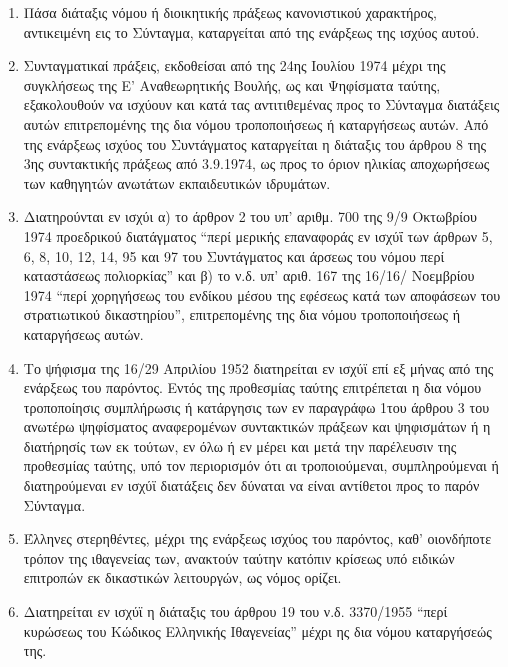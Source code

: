 \documentclass[twoside, a4paper, 10pt]{article}
\begin{document}
\begin{multicols}{2}
\begin{enumerate}
\begin{BigQuote}
\begin{enumerate}
  \item[1.] Πάσα διάταξις νόμου ή διοικητικής πράξεως κανονιστικού χαρακτήρος, αντικειμένη εις το Σύνταγμα, καταργείται από της ενάρξεως της ισχύος αυτού.
  \item[2.] Συνταγματικαί πράξεις, εκδοθείσαι από της 24ης Ιουλίου 1974 μέχρι της συγκλήσεως της Ε' Αναθεωρητικής Βουλής, ως και Ψηφίσματα ταύτης, εξακολουθούν να ισχύουν και κατά τας αντιτιθεμένας προς το Σύνταγμα διατάξεις αυτών επιτρεπομένης της δια νόμου τροποποιήσεως ή καταργήσεως αυτών. Από της ενάρξεως ισχύος  του Συντάγματος καταργείται η διάταξις του άρθρου 8 της 3ης συντακτικής πράξεως από 3.9.1974, ως προς το όριον ηλικίας αποχωρήσεως των  καθηγητών ανωτάτων εκπαιδευτικών ιδρυμάτων.
  \item[3.] Διατηρούνται εν ισχύι α) το άρθρον 2 του υπ' αριθμ. 700 της 9/9 Οκτωβρίου 1974 προεδρικού διατάγματος “περί μερικής επαναφοράς εν ισχύΐ  των άρθρων 5, 6,  8, 10, 12, 14, 95 και 97 του Συντάγματος και άρσεως του νόμου περί καταστάσεως πολιορκίας” και β) το ν.δ. υπ' αριθ. 167 της 16/16/ Νοεμβρίου 1974  “περί χορηγήσεως του ενδίκου μέσου της εφέσεως κατά των αποφάσεων του στρατιωτικού δικαστηρίου”, επιτρεπομένης της δια νόμου τροποποιήσεως ή καταργήσεως αυτών.
  \item[4.] Το ψήφισμα της 16/29 Απριλίου 1952 διατηρείται εν ισχύϊ  επί εξ μήνας από της ενάρξεως του παρόντος. Εντός της προθεσμίας ταύτης επιτρέπεται η δια νόμου τροποποίησις συμπλήρωσις ή κατάργησις των εν παραγράφω 1του άρθρου 3 του ανωτέρω ψηφίσματος αναφερομένων συντακτικών πράξεων και ψηφισμάτων ή η διατήρησίς των εκ τούτων, εν όλω ή εν μέρει  και μετά την παρέλευσιν της προθεσμίας ταύτης, υπό τον περιορισμόν ότι αι τροποιούμεναι, συμπληρούμεναι ή διατηρούμεναι εν ισχύϊ διατάξεις δεν δύναται να είναι αντίθετοι προς το παρόν Σύνταγμα.
  \item[5.] Έλληνες στερηθέντες, μέχρι της ενάρξεως ισχύος του παρόντος, καθ' οιονδήποτε τρόπον της ιθαγενείας των, ανακτούν ταύτην κατόπιν κρίσεως υπό ειδικών επιτροπών εκ δικαστικών λειτουργών, ως νόμος ορίζει.
  \item[6.] Διατηρείται εν ισχύϊ η διάταξις του άρθρου 19 του ν.δ. 3370/1955 “περί κυρώσεως του Κώδικος Ελληνικής Ιθαγενείας” μέχρι ης δια νόμου καταργήσεώς της.
\end{enumerate}


\end{BigQuote}
\end{enumerate}
\end{multicols}
\end{document}
